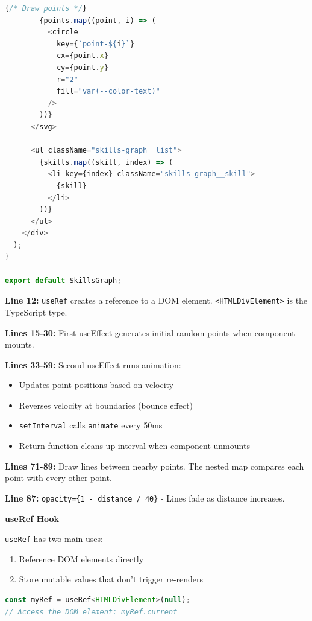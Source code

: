 \documentclass[12pt,a4paper]{article}
\begin{document}
\begin{lstlisting}[language=JavaScript,caption={src/components/SkillsGraph.tsx}]
        {/* Draw points */}
        {points.map((point, i) => (
          <circle
            key={`point-${i}`}
            cx={point.x}
            cy={point.y}
            r="2"
            fill="var(--color-text)"
          />
        ))}
      </svg>

      <ul className="skills-graph__list">
        {skills.map((skill, index) => (
          <li key={index} className="skills-graph__skill">
            {skill}
          </li>
        ))}
      </ul>
    </div>
  );
}

export default SkillsGraph;
\end{lstlisting}

\begin{explanation}
\textbf{Line 12:} \texttt{useRef} creates a reference to a DOM element. \texttt{<HTMLDivElement>} is the TypeScript type.

\textbf{Lines 15-30:} First useEffect generates initial random points when component mounts.

\textbf{Lines 33-59:} Second useEffect runs animation:
\begin{itemize}
    \item Updates point positions based on velocity
    \item Reverses velocity at boundaries (bounce effect)
    \item \texttt{setInterval} calls \texttt{animate} every 50ms
    \item Return function cleans up interval when component unmounts
\end{itemize}

\textbf{Lines 71-89:} Draw lines between nearby points. The nested map compares each point with every other point.

\textbf{Line 87:} \texttt{opacity=\{1 - distance / 40\}} - Lines fade as distance increases.
\end{explanation}

\begin{concept}
\textbf{useRef Hook}

\texttt{useRef} has two main uses:
\begin{enumerate}
    \item Reference DOM elements directly
    \item Store mutable values that don't trigger re-renders
\end{enumerate}

\begin{lstlisting}[language=JavaScript]
const myRef = useRef<HTMLDivElement>(null);
// Access the DOM element: myRef.current
\end{lstlisting}
\end{concept}
\end{document}
